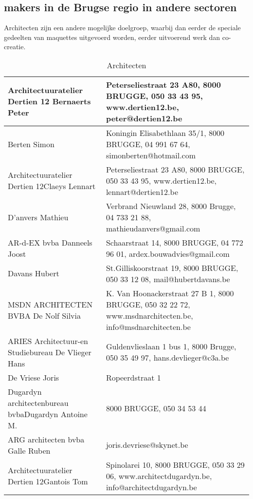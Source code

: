 \subsection{makers in de Brugse regio in andere sectoren} %
\label{sub:makers_in_de_brugse_regio_in_andere_sectoren}

Architecten\cite{architecten} zijn een andere mogelijke doelgroep, waarbij dan eerder de speciale gedeelten van maquettes uitgevoerd worden, eerder uitvoerend werk dan co-creatie.

\begin{longtabu} to \textwidth {XX}
\caption{Architecten}\label{table:makers-architecten}\\ \hline
Architectuuratelier Dertien 12 Bernaerts Peter & Peterseliestraat 23 A80, 8000 BRUGGE, 050 33 43 95, www.dertien12.be, peter@dertien12.be \\ \hline
Berten Simon & Koningin Elisabethlaan 35/1, 8000 BRUGGE, 04 991 67 64, simonberten@hotmail.com \\ \hline
Architectuuratelier Dertien 12Claeys Lennart & Peterseliestraat 23 A80, 8000 BRUGGE, 050 33 43 95, www.dertien12.be, lennart@dertien12.be \\ \hline
D'anvers Mathieu & Verbrand Nieuwland 28, 8000 Brugge, 04 733 21 88, mathieudanvers@gmail.com \\ \hline
AR-d-EX bvba Danneels Joost & Schaarstraat 14, 8000 BRUGGE, 04 772 96 01, ardex.bouwadvies@gmail.com \\ \hline
Davans Hubert & St.Gilliskoorstraat 19, 8000 BRUGGE, 050 33 12 08, mail@hubertdavans.be \\ \hline
MSDN ARCHITECTEN BVBA De Nolf Silvia & K. Van Hoonackerstraat 27 B 1, 8000 BRUGGE, 050 32 22 72, www.msdnarchitecten.be, info@msdnarchitecten.be \\ \hline
ARIES Architectuur-en Studiebureau De Vlieger Hans & Guldenvlieslaan 1 bus 1, 8000 Brugge, 050 35 49 97, hans.devlieger@c3a.be \\ \hline
De Vriese Joris & Ropeerdstraat 1 \\ \hline
Dugardyn architectenbureau bvbaDugardyn Antoine M. & 8000 BRUGGE, 050 34 53 44 \\ \hline
ARG architecten bvba Galle Ruben & joris.devriese@skynet.be \\ \hline
Architectuuratelier Dertien 12Gantois Tom & Spinolarei 10, 8000 BRUGGE, 050 33 29 06, www.architectdugardyn.be, info@architectdugardyn.be \\ \hline

\end{longtabu}
